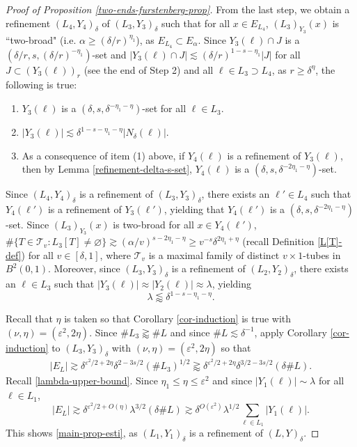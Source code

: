 \documentclass{amsart}
\numberwithin{equation}{section}
\newcommand{\al}{\alpha}
\newcommand{\de}{\delta}
\newcommand{\e}{\varepsilon}
\newcommand{\la}{\lambda}
\newcommand{\cT}{{\mathcal T}}
\begin{document}
\begin{proof}[Proof of Proposition \ref{two-ends-furstenberg-prop}]
From the last step, we obtain a refinement $(L_4,Y_4)_\de$ of $(L_3,Y_3)_\de$ such that for all $x\in E_{L_4}$, $(L_{3})_{Y_3}(x)$  is ``two-broad" (i.e. $\al \geq (\de/r)^{\eta_1}$), as $ E_{L_4}\subset E_\al$.
Since $Y_3(\ell)\cap J$ is a $(\de/r, s, (\de/r)^{-\eta_1})$-set and $|Y_3(\ell)\cap J|\lesssim (\de/r)^{1-s-\eta_1}|J|$ for all $J\subset(Y_3(\ell))_r$ (see the end of Step 2) and all $\ell\in L_3\supset L_4$, as $r\geq\de^\eta$, the following is true:
\begin{enumerate}
    \item $Y_3(\ell)$ is a $(\de,s,\de^{-\eta_1-\eta})$-set for all $\ell\in L_3$.
    \item $|Y_3(\ell)|\lesssim \de^{1-s-\eta_1-\eta}|N_\de(\ell)|$.
    \item As a consequence of item (1) above, if $Y_4(\ell)$ is a refinement of $Y_3(\ell)$, then by Lemma \ref{refinement-delta-s-set}, $Y_4(\ell)$ is a $(\de,s, \de^{-2\eta_1-\eta})$-set.
\end{enumerate}

Since $(L_4,Y_4)_\de$ is a refinement of $(L_3, Y_3)_\de$, there exists an $\ell'\in L_4$ such that $Y_4(\ell')$ is a refinement of $Y_3(\ell')$, yielding that $Y_4(\ell')$ is a $(\de,s, \de^{-2\eta_1-\eta})$-set.
Since $(L_{3})_{Y_3}(x)$  is two-broad for all $x\in Y_4(\ell')$, $\#\{T\in\cT_v:L_3[T]\not=\varnothing\}\gtrsim (\al/v)^{s-2\eta_1-\eta}\geq v^{-s}\de^{2\eta_1+\eta}$ (recall Definition \ref{L[T]-def}) for all $v\in[\de,1]$, where $\cT_v$ is a maximal family of distinct $v\times1$-tubes in $B^2(0,1)$.
Moreover, since $(L_3,Y_3)_\de$ is a refinement of $(L_2, Y_2)_\de$, there exists an $\ell\in L_3$ such that $|Y_3(\ell)|\approx|Y_2(\ell)|\approx\la$, yielding 
\begin{equation}
\label{lambda-upper-bound}
    \la\lessapprox \de^{1-s-\eta_1-\eta}.
\end{equation}


Recall that $\eta$ is taken so that Corollary \ref{cor-induction} is true with $(\nu,\eta)=(\e^2,2\eta)$.
Since $\#L_3\gtrapprox\#L$ and since $\#L\lesssim\de^{-1}$, apply Corollary \ref{cor-induction} to $(L_3,Y_3)_\de$ with $(\nu,\eta)=(\e^2,2\eta)$ so that
\begin{align}
    |E_L|\gtrsim \de^{\e^2/2+2\eta}\de^{2-3s/2}(\# L_3)^{1/2}\gtrapprox\de^{\e^2/2+2\eta}\de^{3/2-3s/2}(\de\# L).
\end{align}
Recall \eqref{lambda-upper-bound}.
Since $\eta_1\leq\eta\leq\e^2$ and since $|Y_1(\ell)|\sim \la$ for all $\ell\in L_1$,
\begin{equation}
    |E_L|\gtrsim \de^{\e^2/2+O(\eta)}\la^{3/2}(\de\#L)\gtrsim\de^{O(\e^2)}\la^{1/2}\sum_{\ell\in L_1}|Y_1(\ell)|.
\end{equation}
This shows \eqref{main-prop-esti}, as $(L_1,Y_1)_\de$ is a refinement of $(L,Y)_\de$.


\end{proof}
\end{document}
